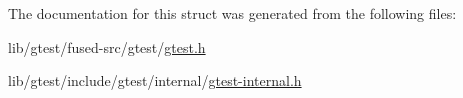 The documentation for this struct was generated from the following files\-:\begin{DoxyCompactItemize}
\item 
lib/gtest/fused-\/src/gtest/\hyperlink{fused-src_2gtest_2gtest_8h}{gtest.\-h}\item 
lib/gtest/include/gtest/internal/\hyperlink{gtest-internal_8h}{gtest-\/internal.\-h}\end{DoxyCompactItemize}
